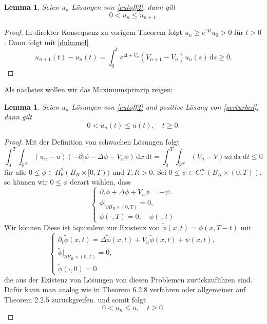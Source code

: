 \documentclass[11pt,twoside,a4paper]{article}
\newtheorem{lem}[thm]{Lemma}
\theoremstyle{break}
\begin{document}
\begin{lem} Seien $u_n$ Lösungen von \eqref{cutoff2}, dann gilt
\begin{equation}
0 <u_n \le u_{n+1}.
\end{equation}
\end{lem}
\begin{proof}
In direkter Konsequenz zu vorigem Theorem folgt $u_n\ge e^{\Delta t} u_0> 0$ für $t>0$. Dann folgt mit \eqref{duhamel} 
\begin{equation}
u_{n+1}(t) -u_n(t)= \int_0^t e^{\Delta + V_n} (V_{n+1}-V_n) u_{n}(s)\, \mathrm ds\ge 0.
\end{equation}
\end{proof}

Als nächstes wollen wir das Maximumsprinzip zeigen:
\begin{lem} Seien $u_n$ Lösungen von \eqref{cutoff2} und positive Lösung von \eqref{perturbed}, dann gilt
\begin{equation}
0<u_n(t)\le u(t), \quad t\ge 0.
\end{equation}
\end{lem}
\begin{proof}
Mit der Definition von schwachen Lösungen folgt
\begin{equation}
\int_0^T \int_{\mathbb R^N} (u_n-u) (-\partial_t \phi - \Delta \phi - V_n \phi) \, \mathrm dx \, \mathrm dt = \int_0^T \int_{\mathbb R^N} (V_n -V) u\phi \, \mathrm dx \, \mathrm dt \le 0
\end{equation} 
für alle $0\le \phi \in H_0^2(B_R \times [0, T))$ und $T,R>0$.  Sei $0 \le \psi \in C_c^\infty(B_R\times (0,T))$, so können wir $0 \le  \phi$ derart wählen, dass 
\begin{equation}
\begin{cases}
\partial_t \phi + \Delta \phi + V_n \phi = - \psi.\\
\phi\big|_{\partial B_R \times (0,T)} =0,\\
\phi(\cdot ,T)=0, \quad \phi(\cdot, t)
\end{cases}
\end{equation}
Wir können 
Diese ist äquivalent zur Existenz von $\tilde \phi(x,t)=\phi(x,T-t)$ mit
\begin{equation}
\begin{cases}
\partial_t \tilde \phi(x,t) = \Delta \tilde \phi(x,t)+V_n \tilde \phi(x,t)+\psi(x,t),\\
\tilde \phi\big|_{\partial B_R \times (0,T)} =0,\\
\tilde \phi(\cdot,0)=0
\end{cases}
\end{equation}
die aus der Existenz von Lösungen von diesen Problemen zurückzuführen sind. Dafür kann man analog wie in \cite{arendt} Theorem 6.2.8 verfahren oder allgemeiner auf \cite{lady} Theorem 2.2.5 zurückgreifen.
und somit folgt 
\begin{equation}
0<u_n \le u, \quad t\ge 0.
\end{equation}
\end{proof}
\end{document}
